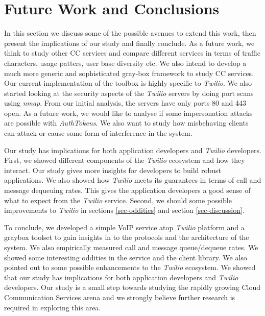 \section{Future Work and Conclusions}
\label{sec-futureandconclusion}

In this section we discuss some of the possible avenues to extend this work, then present the implications of our study and finally conclude. As a future work, we think to study other CC services and compare different services in terms of traffic characters, usage patters, user base diversity etc. We also intend to develop a much more generic and sophisticated gray-box framework to study CC services. Our current implementation of the toolbox is highly specific to \textit{Twilio}. We also started looking at the security aspects of the \textit{Twilio} servers by doing port scans using \textit{nmap}. From our initial analysis, the servers have only ports 80 and 443 open. As a future work, we would like to analyse if some impersonation attacks are possible with \textit{AuthTokens}. We also want to study how misbehaving clients can attack or cause some form of interference in the system.

Our study has implications for both application developers and \textit{Twilio} developers. First, we showed different components of the \textit{Twilio} ecosystem and how they interact. Our study gives more insights for developers to build robust applications. We also showed how \textit{Twilio} meets its guarantees in terms of call and message dequeuing rates. This gives the application developers a good sense of what to expect from the \textit{Twilio} service. Second, we should some possible improvements to \textit{Twilio} in sections \ref{sec-oddities} and section \ref{sec-discussion}.

To conclude, we developed a simple VoIP service atop \textit{Twilio} platform and a graybox toolset to gain insights in to the protocols and the architecture of the system. We also empirically measured call and message queue/dequeue rates. We showed some interesting oddities in the service and the client library. We also pointed out to some possible enhancements to the \textit{Twilio} ecosystem. We showed that our study has implications for both application developers and \textit{Twilio} developers. Our study is a small step towards studying the rapidly growing Cloud Communication Services arena and we strongly believe further research is required in exploring this area. 